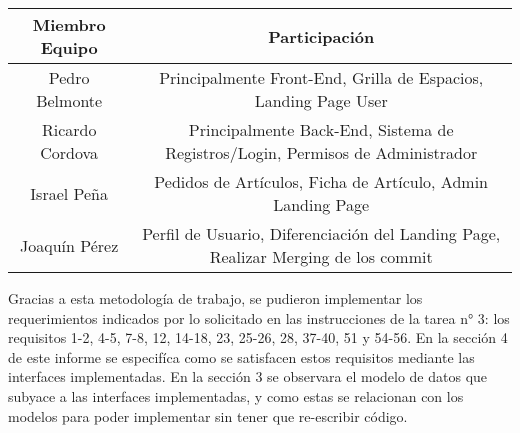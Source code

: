 \begin{table}[H]
  \centering
	\begin{tabular}{|c|c|}
	\hline 
	Miembro Equipo & Participación \\ 
	\hline 
	Pedro Belmonte & 
	Principalmente Front-End, Grilla de Espacios, Landing Page User
	\\ 
	\hline 
	Ricardo Cordova & 
	Principalmente Back-End, Sistema de Registros/Login, Permisos de Administrador
	\\ 
 	\hline 
	Israel Peña & 
	Pedidos de Artículos, Ficha de Artículo, Admin Landing Page
	\\ 
	\hline 
	Joaquín Pérez &
	Perfil de Usuario, Diferenciación del Landing Page, Realizar Merging de los commit 
	\\ 
	\hline 
	\end{tabular} 
\end{table}

Gracias a esta metodología de trabajo, se pudieron implementar los requerimientos indicados por lo solicitado en las instrucciones de la tarea n° 3: los requisitos 1-2, 4-5, 7-8, 12, 14-18, 23, 25-26, 28, 37-40, 51 y 54-56. En la sección 4 de este informe se especifíca como se satisfacen estos requisitos mediante las interfaces implementadas. En la sección 3 se observara el modelo de datos que subyace a las interfaces implementadas, y como estas se relacionan con los modelos para poder implementar sin tener que re-escribir código. 
\fi